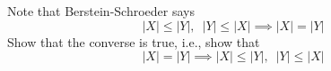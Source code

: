   Note that Berstein-Schroeder says
  \[
  |X| \leq |Y|, \,\,\, |Y| \leq |X| \implies
  |X| = |Y|
  \]
  Show that the converse is true, i.e., show that
  \[
  |X| = |Y|
  \implies
  |X| \leq |Y|, \,\,\, |Y| \leq |X| 
  \]
